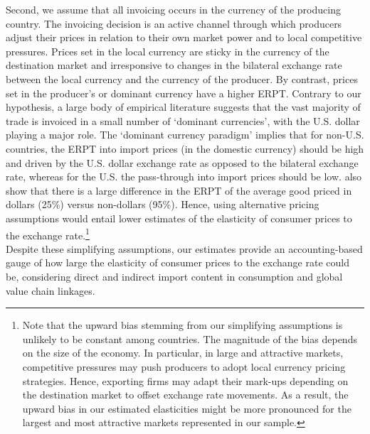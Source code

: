 \documentclass[11pt,a4paper]{paper} %
\begin{document}
Second, we assume that all invoicing occurs in the currency of the producing country. The invoicing decision is an active channel through which producers adjust their prices in relation to their own market power and to local competitive pressures. Prices set in the local currency are sticky in the currency of the destination market and irresponsive to changes in the bilateral exchange rate between the local currency and the currency of the producer. By contrast, prices set in the producer's or dominant currency have a higher ERPT. Contrary to our hypothesis, a large body of empirical literature suggests that the vast majority of trade is invoiced in a small number of ‘dominant currencies’, with the U.S. dollar playing a major role. The ‘dominant currency paradigm’ \citep{Gopinath2020} implies that for non-U.S. countries, the ERPT into import prices (in the domestic currency) should be high and driven by the U.S. dollar exchange rate as opposed to the bilateral exchange rate, whereas for the U.S. the pass-through into import prices should be low. \cite{Gopinath2010} also show that there is a large difference in the ERPT of the average good priced in dollars (25\%) versus non-dollars (95\%).
Hence, using alternative pricing assumptions would entail lower estimates of the elasticity of consumer prices to the exchange rate.\footnote{Note that the upward bias stemming from our simplifying assumptions is unlikely to be constant among countries.
The magnitude of the bias depends on the size of the economy.
In particular, in large and attractive markets, competitive pressures may push producers to adopt local currency pricing strategies. Hence, exporting firms may adapt their mark-ups depending on the destination market to offset exchange rate movements.
As a result, the upward bias in our estimated elasticities might be more pronounced for the largest and most attractive markets represented in our sample.} \\
Despite these simplifying assumptions, our estimates provide an accounting-based gauge of how large the elasticity of consumer prices to the exchange rate could be, considering direct and indirect import content in consumption and global value chain linkages. 
\end{document}
